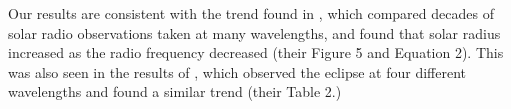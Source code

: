 Our results are consistent with the trend found in \cite{menezes_solar_2017}, which compared decades of solar radio observations taken at many wavelengths, and found that solar radius increased as the radio frequency decreased (their Figure 5 and Equation 2).
This was also seen in the results of \cite{messerotti_radio_2000}, which observed the eclipse at four different wavelengths and found a similar trend (their Table 2.)



